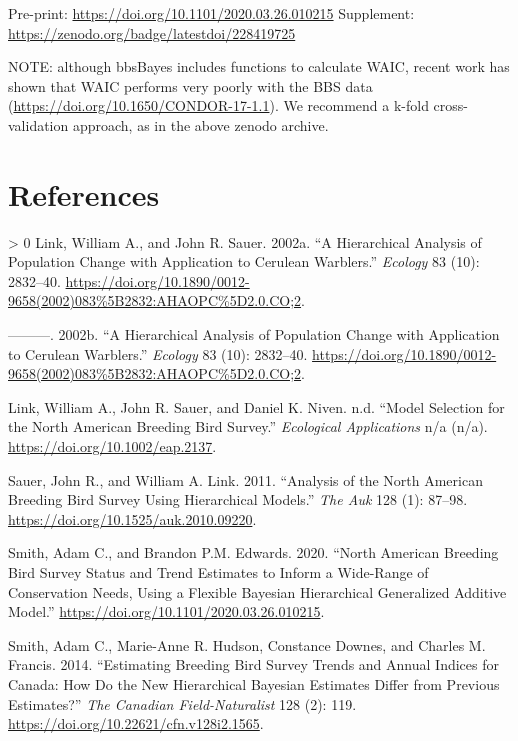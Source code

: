 \documentclass[
]{book}
\newlength{\cslhangindent}
\newenvironment{CSLReferences}[3] %
 {%
  \setlength{\parindent}{0pt}
  \ifodd #1 \everypar{\setlength{\hangindent}{\cslhangindent}}\ignorespaces\fi
  \ifnum #2 > 0
  \setlength{\parskip}{#3\baselineskip}
  \fi
 }%
 {}
\begin{document}
Pre-print: \url{https://doi.org/10.1101/2020.03.26.010215}
Supplement: \url{https://zenodo.org/badge/latestdoi/228419725}

NOTE: although bbsBayes includes functions to calculate WAIC, recent work has shown that WAIC performs very poorly with the BBS data (\url{https://doi.org/10.1650/CONDOR-17-1.1}). We recommend a k-fold cross-validation approach, as in the above zenodo archive.

\hypertarget{Ref}{%
\chapter{References}\label{Ref}}

\hypertarget{refs}{}
\begin{CSLReferences}{1}{0}
\leavevmode\hypertarget{ref-link2002}{}%
Link, William A., and John R. Sauer. 2002a. {``A Hierarchical Analysis of Population Change with Application to Cerulean Warblers.''} \emph{Ecology} 83 (10): 2832--40. \url{https://doi.org/10.1890/0012-9658(2002)083\%5B2832:AHAOPC\%5D2.0.CO;2}.

\leavevmode\hypertarget{ref-link2002a}{}%
---------. 2002b. {``A Hierarchical Analysis of Population Change with Application to Cerulean Warblers.''} \emph{Ecology} 83 (10): 2832--40. \url{https://doi.org/10.1890/0012-9658(2002)083\%5B2832:AHAOPC\%5D2.0.CO;2}.

\leavevmode\hypertarget{ref-link}{}%
Link, William A., John R. Sauer, and Daniel K. Niven. n.d. {``Model Selection for the North American Breeding Bird Survey.''} \emph{Ecological Applications} n/a (n/a). \url{https://doi.org/10.1002/eap.2137}.

\leavevmode\hypertarget{ref-sauer2011}{}%
Sauer, John R., and William A. Link. 2011. {``Analysis of the North American Breeding Bird Survey Using Hierarchical Models.''} \emph{The Auk} 128 (1): 87--98. \url{https://doi.org/10.1525/auk.2010.09220}.

\leavevmode\hypertarget{ref-smith2020a}{}%
Smith, Adam C., and Brandon P.M. Edwards. 2020. {``North American Breeding Bird Survey Status and Trend Estimates to Inform a Wide-Range of Conservation Needs, Using a Flexible Bayesian Hierarchical Generalized Additive Model.''} \url{https://doi.org/10.1101/2020.03.26.010215}.

\leavevmode\hypertarget{ref-smith2014}{}%
Smith, Adam C., Marie-Anne R. Hudson, Constance Downes, and Charles M. Francis. 2014. {``Estimating Breeding Bird Survey Trends and Annual Indices for Canada: How Do the New Hierarchical Bayesian Estimates Differ from Previous Estimates?''} \emph{The Canadian Field-Naturalist} 128 (2): 119. \url{https://doi.org/10.22621/cfn.v128i2.1565}.

\end{CSLReferences}
\end{document}
